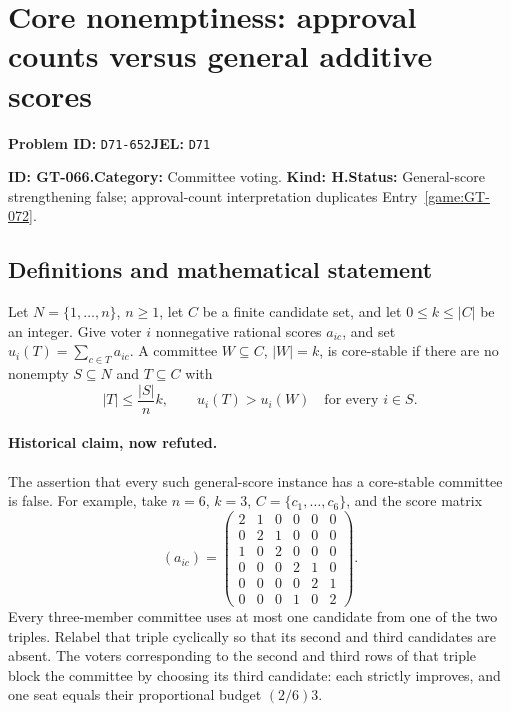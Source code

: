 \documentclass[11pt,a4paper]{article}
\begin{document}
\section*{Core nonemptiness: approval counts versus general additive scores}
\textbf{Problem ID:} \texttt{D71-652}\quad \textbf{JEL:} \texttt{D71}\par
\label{problem:OP-0196}
\label{game:GT-066}
{\sffamily\small\color{muted}
\noindent\textbf{ID: GT-066.}\quad\textbf{Category:} Committee voting.
\quad\textbf{Kind: H.}\quad\textbf{Status:} General-score strengthening false;
approval-count interpretation duplicates Entry~\ref{game:GT-072}.
\par}
\subsection*{Definitions and mathematical statement}
Let \(N=\{1,\ldots,n\}\), \(n\geq 1\), let \(C\) be a finite candidate
set, and let \(0\leq k\leq |C|\) be an integer.
Give voter \(i\) nonnegative rational scores \(a_{ic}\), and set
\(u_i(T)=\sum_{c\in T}a_{ic}\).
A committee \(W\subseteq C\), \(|W|=k\), is core-stable if there are no
nonempty \(S\subseteq N\) and \(T\subseteq C\) with
\[
 |T|\leq \frac{|S|}{n}k,\qquad
 u_i(T)>u_i(W)\quad\text{for every }i\in S.
\]

\paragraph{Historical claim, now refuted.}
The assertion that every such general-score instance has a core-stable
committee is false. For example, take \(n=6\), \(k=3\),
\(C=\{c_1,\ldots,c_6\}\), and the score matrix
\[
 (a_{ic})=
 \begin{pmatrix}
 2&1&0&0&0&0\\
 0&2&1&0&0&0\\
 1&0&2&0&0&0\\
 0&0&0&2&1&0\\
 0&0&0&0&2&1\\
 0&0&0&1&0&2
 \end{pmatrix}.
\]
Every three-member committee uses at most one candidate from one of the
two triples. Relabel that triple cyclically so that its second and third
candidates are absent. The voters corresponding to the second and third
rows of that triple block the committee by choosing its third candidate:
each strictly improves, and one seat equals their proportional budget
\((2/6)3\).
\end{document}
